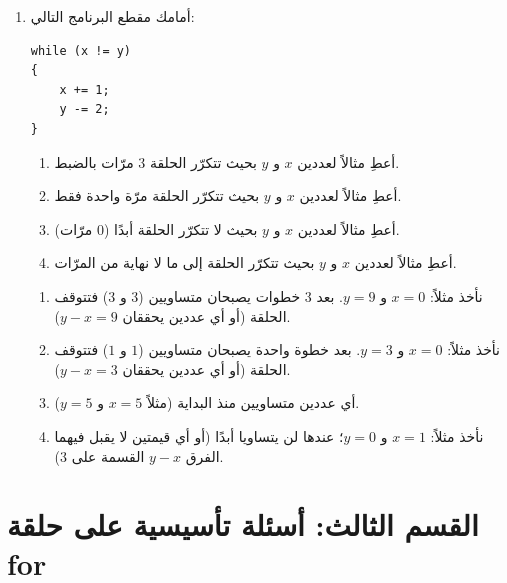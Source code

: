 \documentclass[14pt]{extarticle}
\begin{document}
\begin{enumerate}[resume, itemsep=1em]
\item أمامك مقطع البرنامج التالي:
\begin{boxCode}
\begin{english}
\begin{verbatim}
while (x != y)
{
    x += 1;
    y -= 2;
}
\end{verbatim}
\end{english}
\end{boxCode}
\begin{enumerate}
    \item أعطِ مثالاً لعددين $x$ و $y$ بحيث تتكرّر الحلقة $3$ مرّات بالضبط.
    \item أعطِ مثالاً لعددين $x$ و $y$ بحيث تتكرّر الحلقة مرّة واحدة فقط.
    \item أعطِ مثالاً لعددين $x$ و $y$ بحيث لا تتكرّر الحلقة أبدًا ($0$ مرّات).
    \item أعطِ مثالاً لعددين $x$ و $y$ بحيث تتكرّر الحلقة إلى ما لا نهاية من المرّات.
\end{enumerate}
\ifwithsols
\begin{boxSolution}
\begin{enumerate}
    \item نأخذ مثلاً: $x = 0$ و $y = 9$. بعد $3$ خطوات يصبحان متساويين ($3$ و $3$) فتتوقف الحلقة (أو أي عددين يحققان $y - x = 9$).
    \item نأخذ مثلاً: $x = 0$ و $y = 3$. بعد خطوة واحدة يصبحان متساويين ($1$ و $1$) فتتوقف الحلقة (أو أي عددين يحققان $y - x = 3$).
    \item أي عددين متساويين منذ البداية (مثلاً $x = 5$ و $y = 5$).
    \item نأخذ مثلاً: $x = 1$ و $y = 0$؛ عندها لن يتساويا أبدًا (أو أي قيمتين لا يقبل فيهما الفرق $y - x$ القسمة على $3$).
\end{enumerate}
\end{boxSolution}
\fi
\filbreak

\end{enumerate}

\clearpage
\section*{القسم الثالث: أسئلة تأسيسية على حلقة \textenglish{for}}
\end{document}
